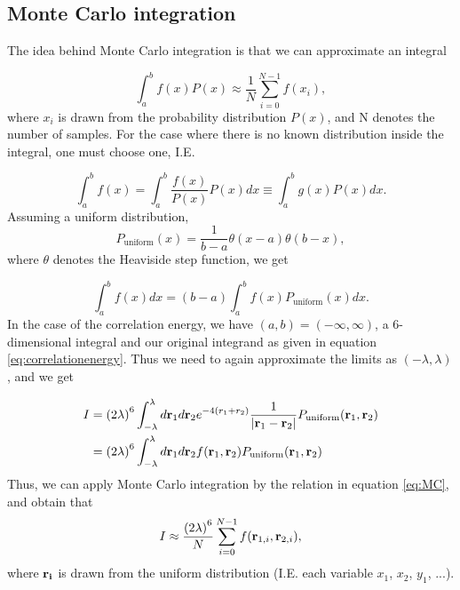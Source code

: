 \documentclass{emulateapj}
\begin{document}
\subsection{Monte Carlo integration}
The idea behind Monte Carlo integration is that we can approximate an integral

\begin{equation} \label{eq:MC}
    \int_a^b f\left(x\right) P\left(x\right) \approx \frac{1}{N}\sum_{i=0}^{N-1} f\left(x_i\right),
\end{equation}
where $x_i$ is drawn from the probability distribution $P\left(x\right)$, and N denotes the number of samples. For the case where there is no known distribution inside the integral, one must choose one, I.E.

\begin{equation}
    \int_a^b f\left(x\right) = \int_a^b \frac{f\left(x\right)}{P\left(x\right)}P\left(x\right) dx \equiv \int_a^b g\left(x\right) P\left(x\right) dx.
\end{equation}
Assuming a uniform distribution,
\begin{equation}
    P_\text{uniform}(x) = \frac{1}{b-a}\theta\left(x-a\right)\theta\left(b-x\right),
\end{equation}
where $\theta$ denotes the Heaviside step function, we get

\begin{equation}
    \int_a^b f(x) dx = \left(b-a\right) \int_a^b f(x) P_\text{uniform}(x) dx.
\end{equation}
In the case of the correlation energy, we have $(a,b) = (-\infty,\infty)$, a 6-dimensional integral and our original integrand as given in equation \ref{eq:correlationenergy}. Thus we need to again approximate the limits as $(-\lambda,\lambda)$, and we get

\begin{align*}
    I &= \left(2\lambda\right)^6 \int_{-\lambda}^{\lambda} d{\bf r}_1d{\bf r}_2  e^{-4 (r_1+r_2)}\frac{1}{|{\bf r}_1-{\bf r}_2|} P_\text{uniform}({\bf r}_1, {\bf r}_2) \\
    &= \left(2\lambda\right)^6 \int_{-\lambda}^{\lambda} d{\bf r}_1d{\bf r}_2 f({\bf r}_1, {\bf r}_2) P_\text{uniform}({\bf r}_1, {\bf r}_2)
\end{align*}
Thus, we can apply Monte Carlo integration by the relation in equation \ref{eq:MC}, and obtain that
\begin{equation}
    I \approx \frac{\left(2\lambda\right)^6}{N}\sum_{i=0}^{N-1} f({\bf r}_{1,i}, {\bf r}_{2,i}),
\end{equation}
where $\bf r_i$ is drawn from the uniform distribution (I.E. each variable $x_1$, $x_2$, $y_1$, ...).
\end{document}
